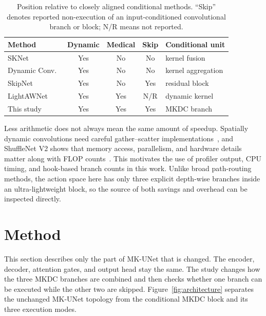 \documentclass[conference]{IEEEtran}
\begin{document}
\begin{table}[t]
\caption{Position relative to closely aligned conditional methods. ``Skip'' denotes reported non-execution of an input-conditioned convolutional branch or block; N/R means not reported.}
\label{tab:novelty}
\centering
\scriptsize
\setlength{\tabcolsep}{3.2pt}
\begin{tabular}{lcccl}
\toprule
Method & Dynamic & Medical & Skip & Conditional unit \\
\midrule
SKNet~\cite{li2019sknet} & Yes & No & No & kernel fusion \\
Dynamic Conv.~\cite{chen2020dynamicconv} & Yes & No & No & kernel aggregation \\
SkipNet~\cite{wang2018skipnet} & Yes & No & Yes & residual block \\
LightAWNet~\cite{wang2025lightawnet} & Yes & Yes & N/R & dynamic kernel \\
This study & Yes & Yes & Yes & MKDC branch \\
\bottomrule
\end{tabular}
\end{table}

Less arithmetic does not always mean the same amount of speedup. Spatially dynamic convolutions need careful gather--scatter implementations~\cite{verelst2020spatial}, and ShuffleNet V2 shows that memory access, parallelism, and hardware details matter along with FLOP counts~\cite{ma2018shufflenetv2}. This motivates the use of profiler output, CPU timing, and hook-based branch counts in this work. Unlike broad path-routing methods, the action space here has only three explicit depth-wise branches inside an ultra-lightweight block, so the source of both savings and overhead can be inspected directly.

\section{Method}
This section describes only the part of MK-UNet that is changed. The encoder, decoder, attention gates, and output head stay the same. The study changes how the three MKDC branches are combined and then checks whether one branch can be executed while the other two are skipped. Figure~\ref{fig:architecture} separates the unchanged MK-UNet topology from the conditional MKDC block and its three execution modes.
\end{document}
